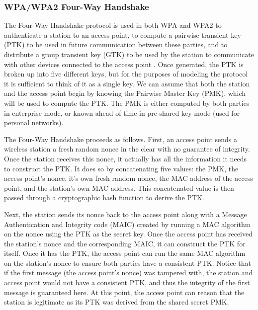 \documentclass[11pt, twocolumn]{article} %
\begin{document}
{%

\subsubsection{WPA/WPA2 Four-Way Handshake}
The Four-Way Handshake protocol is used in both WPA and WPA2 to authenticate a station to an access point, to compute a pairwise transient key (PTK) to be used in future communication between these parties, and to distribute a group transient key (GTK) to be used by the station to communicate with other devices connected to the access point \cite{liu08}.  Once generated, the PTK is broken up into five different keys, but for the purposes of modeling the protocol it is sufficient to think of it as a single key.  We can assume that both the station and the access point begin by knowing the Pairwise Master Key (PMK), which will be used to compute the PTK.  The PMK is either computed by both parties in enterprise mode, or known ahead of time in pre-shared key mode (used for personal networks).

The Four-Way Handshake proceeds as follows.  First, an access point sends a wireless station a fresh random nonce in the clear with no guarantee of integrity.  Once the station receives this nonce, it actually has all the information it needs to construct the PTK.  It does so by concatenating five values: the PMK, the access point's nonce, it's own fresh random nonce, the MAC address of the access point, and the station's own MAC address.  This concatenated value is then passed through a cryptographic hash function to derive the PTK.  

Next, the station sends its nonce back to the access point along with a Message Authentication and Integrity code (MAIC) created by running a MAC algorithm on the nonce using the PTK as the secret key.  Once the access point has received the station's nonce and the corresponding MAIC, it can construct the PTK for itself.  Once it has the PTK, the access point can run the same MAC algorithm on the station's nonce to ensure both parties have a consistent PTK.  Notice that if the first message (the access point's nonce) was tampered with, the station and access point would not have a consistent PTK, and thus the integrity of the first message is guaranteed here.  At this point, the access point can reason that the station is legitimate as its PTK was derived from the shared secret PMK.  

}
\end{document}
